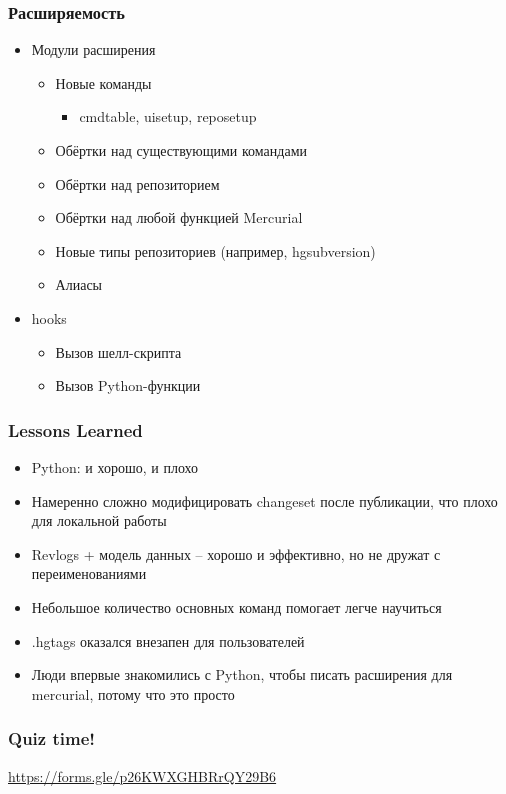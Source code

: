 \documentclass[xetex,mathserif,serif]{beamer}
\begin{document}
	\begin{frame}
		\frametitle{Расширяемость}
		\begin{itemize}
			\item Модули расширения
			\begin{itemize}
				\item Новые команды
				\begin{itemize}
					\item cmdtable, uisetup, reposetup
				\end{itemize}
				\item Обёртки над существующими командами
				\item Обёртки над репозиторием
				\item Обёртки над любой функцией Mercurial
				\item Новые типы репозиториев (например, hgsubversion)
				\item Алиасы
			\end{itemize}
			\item hooks
			\begin{itemize}
				\item Вызов шелл-скрипта
				\item Вызов Python-функции
			\end{itemize}
		\end{itemize}
	\end{frame}

	\begin{frame}
		\frametitle{Lessons Learned}
		\begin{itemize}
			\item Python: и хорошо, и плохо
			\item Намеренно сложно модифицировать changeset после публикации, что плохо для локальной работы
			\item Revlogs + модель данных -- хорошо и эффективно, но не дружат с переименованиями
			\item Небольшое количество основных команд помогает легче научиться
			\item .hgtags оказался внезапен для пользователей
			\item Люди впервые знакомились с Python, чтобы писать расширения для mercurial, потому что это просто
		\end{itemize}
	\end{frame}

	\begin{frame}
		\frametitle{Quiz time!}
		\begin{center}
			\url{https://forms.gle/p26KWXGHBRrQY29B6}
		\end{center}
	\end{frame}
\end{document}
